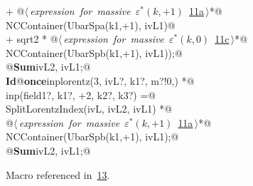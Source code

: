 \documentclass[a4paper,12pt]{amsart}
\renewcommand{\NWlink}[2]{\hyperlink{#1}{#2}}
\renewcommand{\NWtxtMacroRefIn}{Macro referenced in}
\renewcommand{\NWsep}{${\diamond}$}
\begin{document}
\begin{flushleft}
\begin{minipage}{\linewidth}
\begin{list}{}{}
\mbox{}\verb@   + @\hbox{$\langle\,${\itshape expression for massive $\varepsilon^\ast(k, +1)$}\nobreak\ {\footnotesize \NWlink{nuweb11a}{11a}}$\,\rangle$}\verb@ *@\\
\mbox{}\verb@     NCContainer(UbarSpa(k1,+1), ivL1)@\\
\mbox{}\verb@   + sqrt2 * @\hbox{$\langle\,${\itshape expression for massive $\varepsilon^\ast(k, 0)$}\nobreak\ {\footnotesize \NWlink{nuweb11c}{11c}}$\,\rangle$}\verb@ *@\\
\mbox{}\verb@     NCContainer(UbarSpb(k1,+1), ivL1));@\\
\mbox{}\verb@   @\hbox{\sffamily\bfseries Sum}\verb@ ivL2, ivL1;@\\
\mbox{}\verb@@\hbox{\sffamily\bfseries Id}\verb@ @\hbox{\sffamily\bfseries once}\verb@ inplorentz(3, ivL?, k1?, m?!{0,}) *@\\
\mbox{}\verb@      inp(field1?, k1?, +2, k2?, k3?) =@\\
\mbox{}\verb@   SplitLorentzIndex(ivL, ivL2, ivL1) *@\\
\mbox{}\verb@   @\hbox{$\langle\,${\itshape expression for massive $\varepsilon^\ast(k, +1)$}\nobreak\ {\footnotesize \NWlink{nuweb11a}{11a}}$\,\rangle$}\verb@ *@\\
\mbox{}\verb@   NCContainer(UbarSpb(k1,+1), ivL1);@\\
\mbox{}\verb@   @\hbox{\sffamily\bfseries Sum}\verb@ ivL2, ivL1;@\\
\mbox{}\verb@@{\NWsep}
\end{list}
\vspace{-1.5ex}
\footnotesize
\begin{list}{}{\setlength{\itemsep}{-\parsep}\setlength{\itemindent}{-\leftmargin}}
\item \NWtxtMacroRefIn\ \NWlink{nuweb13}{13}.

\item{}
\end{list}
\end{minipage}\vspace{4ex}
\end{flushleft}
\end{document}
